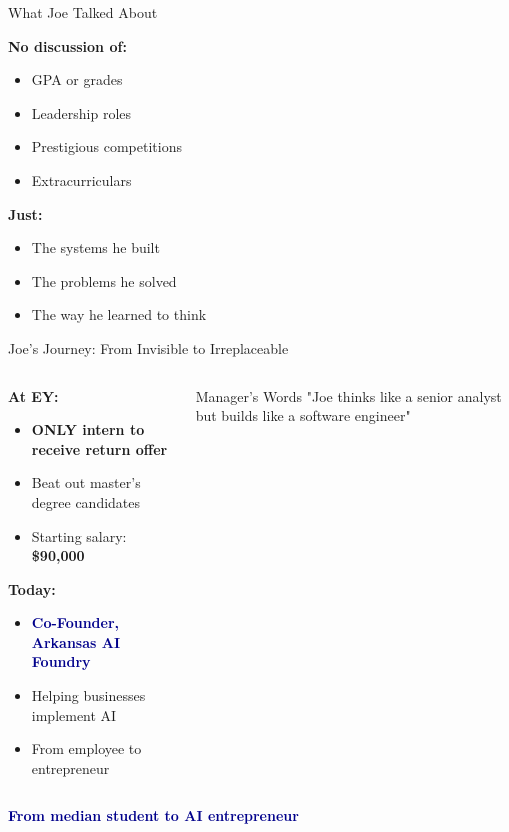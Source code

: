\documentclass[aspectratio=169,12pt]{beamer}
\begin{document}
\begin{frame}{What Joe Talked About}
\begin{center}
\textbf{\large No discussion of:}
\begin{itemize}
\item[\faTimesCircle] GPA or grades
\item[\faTimesCircle] Leadership roles
\item[\faTimesCircle] Prestigious competitions
\item[\faTimesCircle] Extracurriculars
\end{itemize}

\vspace{0.5cm}
\textbf{\large Just:}
\begin{itemize}
\item[\faCheckCircle] \textcolor{successgreen}{The systems he built}
\item[\faCheckCircle] \textcolor{successgreen}{The problems he solved}
\item[\faCheckCircle] \textcolor{successgreen}{The way he learned to think}
\end{itemize}
\end{center}
\end{frame}

\begin{frame}{Joe's Journey: From Invisible to Irreplaceable}
\begin{columns}
\begin{column}{0.6\textwidth}
\textbf{\large At EY:}
\begin{itemize}
\item \textcolor{successgreen}{\textbf{ONLY intern to receive return offer}}
\item Beat out master's degree candidates
\item Starting salary: \textbf{\$90,000}
\end{itemize}
\vspace{0.3cm}
\textbf{\large Today:}
\begin{itemize}
\item \textcolor{darkblue}{\textbf{Co-Founder, Arkansas AI Foundry}}
\item Helping businesses implement AI
\item From employee to entrepreneur
\end{itemize}
\end{column}
\begin{column}{0.4\textwidth}
\begin{block}{Manager's Words}
\small
"Joe thinks like a senior analyst but builds like a software engineer"
\end{block}
\end{column}
\end{columns}

\vspace{0.5cm}
\begin{center}
\large
\textcolor{darkblue}{\textbf{From median student to AI entrepreneur}}
\end{center}
\end{frame}
\end{document}
